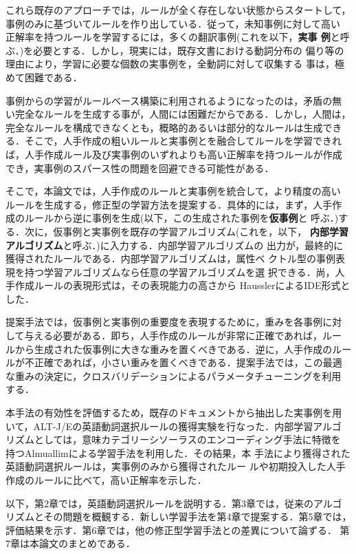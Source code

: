 これら既存のアプローチでは，ルールが全く存在しない状態からスタートして，
事例のみに基づいてルールを作り出している．従って，未知事例に対して高い
正解率を持つルールを学習するには，多くの翻訳事例(これを以下，{\bf 実事
例}と呼ぶ．)を必要とする．しかし，現実には，既存文書における動詞分布の
偏り等の理由により，学習に必要な個数の実事例を，全動詞に対して収集する
事は，極めて困難である．

事例からの学習がルールベース構築に利用されるようになったのは，矛盾の無
い完全なルールを生成する事が，人間には困難だからである．しかし，人間は，
完全なルールを構成できなくとも，概略的あるいは部分的なルールは生成でき
る．そこで，人手作成の粗いルールと実事例とを融合してルールを学習できれ
ば，人手作成ルール及び実事例のいずれよりも高い正解率を持つルールが作成
でき，実事例のスパース性の問題を回避できる可能性がある．

そこで，本論文では，人手作成のルールと実事例を統合して，より精度の高い
ルールを生成する，修正型の学習方法を提案する．具体的には，まず，人手作
成のルールから逆に事例を生成(以下，この生成された事例を{\bf 仮事例}と
呼ぶ．)する．次に，仮事例と実事例を既存の学習アルゴリズム(これを，以下，
{\bf 内部学習アルゴリズム}と呼ぶ．)に入力する．内部学習アルゴリズムの
出力が，最終的に獲得されたルールである．内部学習アルゴリズムは，属性ベ
クトル型の事例表現を持つ学習アルゴリズムなら任意の学習アルゴリズムを選
択できる．尚，人手作成ルールの表現形式は，その表現能力の高さから
HausslerによるIDE形式\cite{Haussler88}とした．

提案手法では，仮事例と実事例の重要度を表現するために，重みを各事例に対
して与える必要がある．即ち，人手作成のルールが非常に正確であれば，ルー
ルから生成された仮事例に大きな重みを置くべきである．逆に，人手作成のルー
ルが不正確であれば，小さい重みを置くべきである．提案手法では，この最適
な重みの決定に，クロスバリデーションによるパラメータチューニングを利用
する．

本手法の有効性を評価するため，既存のドキュメントから抽出した実事例を用
いて，ALT-J/Eの英語動詞選択ルールの獲得実験を行なった．内部学習アルゴ
リズムとしては，意味カテゴリーシソーラスのエンコーディング手法に特徴を
持つAlmuallimによる学習手法\cite{Almuallim94c}を利用した．その結果，本
手法により獲得された英語動詞選択ルールは，実事例のみから獲得されたルー
ルや初期投入した人手作成のルールに比べて，高い正解率を示した．

以下，第2章では，英語動詞選択ルールを説明する．第3章では，従来のアルゴ
リズムとその問題を概観する．新しい学習手法を第4章で提案する．第5章では，
評価結果を示す．第6章では，他の修正型学習手法との差異について論ずる．
第7章は本論文のまとめである．

